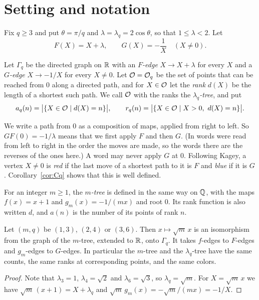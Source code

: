 \section{Setting and notation}\label{sec:setup}

Fix $q\ge3$ and put $\theta=\pi/q$ and $\lambda=\lambda_q=2\cos\theta$, so that $1\le\lambda<2$. Let
\[
F(X)=X+\lambda,\qquad G(X)=-\frac1X\quad(X\neq0).
\]

\begin{definition}\label{def:tree}
Let $\Gamma_q$ be the directed graph on $\mathbb{R}$ with an \emph{$F$-edge} $X\to X+\lambda$ for every $X$
and a \emph{$G$-edge} $X\to-1/X$ for every $X\neq0$. Let $\mathcal{O}=\mathcal{O}_q$ be the set of points that can
be reached from $0$ along a directed path, and for $X\in\mathcal{O}$ let the \emph{rank} $d(X)$ be the
length of a shortest such path. We call $\mathcal{O}$ with the ranks the \emph{$\lambda_q$-tree}, and put
\[
a_q(n)=\bigl|\{X\in\Orb\mid d(X)=n\}\bigr|,\qquad r_q(n)=\bigl|\{X\in\Orb\mid X>0,\ d(X)=n\}\bigr| .
\]
\end{definition}

We write a path from $0$ as a composition of maps, applied from right to left. So $GF(0)=-1/\lambda$
means that we first apply $F$ and then $G$. (In \cite{P137} words were read from left to right in
the order the moves are made, so the words there are the reverses of the ones here.) A word may
never apply $G$ at $0$. Following Kagey, a vertex $X\neq0$ is \emph{red} if the last move of a
shortest path to it is $F$ and \emph{blue} if it is $G$. Corollary~\ref{cor:Cq} shows that this is
well defined.

\begin{definition}\label{def:mtree}
For an integer $m\ge1$, the \emph{$m$-tree} is defined in the same way on $\mathbb{Q}$, with the maps
$f(x)=x+1$ and $g_m(x)=-1/(mx)$ and root $0$. Its rank function is also written $d$, and $a(n)$ is
the number of its points of rank $n$.
\end{definition}

\begin{lemma}\label{lem:coords}
Let $(m,q)$ be $(1,3)$, $(2,4)$ or $(3,6)$. Then $x\mapsto\sqrt m\,x$ is an isomorphism from the
graph of the $m$-tree, extended to $\mathbb{R}$, onto $\Gamma_q$. It takes $f$-edges to $F$-edges and
$g_m$-edges to $G$-edges. In particular the $m$-tree and the $\lambda_q$-tree have the same counts,
the same ranks at corresponding points, and the same colors.
\end{lemma}

\begin{proof}
Note that $\lambda_3=1$, $\lambda_4=\sqrt2$ and $\lambda_6=\sqrt3$, so $\lambda_q=\sqrt m$. For
$X=\sqrt m\,x$ we have $\sqrt m\,(x+1)=X+\lambda_q$ and $\sqrt m\,g_m(x)=-\sqrt m/(mx)=-1/X$.
\end{proof}

